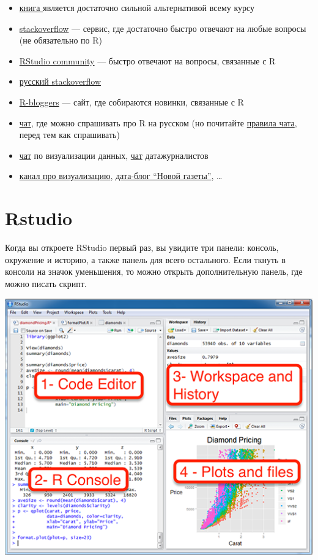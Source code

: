 \documentclass[]{book}
\providecommand{\tightlist}{%
  \setlength{\itemsep}{0pt}\setlength{\parskip}{0pt}}
\begin{document}
\begin{itemize}
\tightlist
\item
  \href{https://r4ds.had.co.nz/}{книга \citep{wickham16}} является достаточно сильной альтернативой всему курсу
\item
  \href{https://stackoverflow.com}{stackoverflow} --- сервис, где достаточно быстро отвечают на любые вопросы (не обязательно по R)
\item
  \href{https://community.rstudio.com/}{RStudio community} --- быстро отвечают на вопросы, связанные с R
\item
  \href{https://ru.stackoverflow.com}{русский stackoverflow}
\item
  \href{https://www.r-bloggers.com/}{R-bloggers} --- сайт, где собираются новинки, связанные с R
\item
  \href{https://t.me/rlang_ru}{чат}, где можно спрашивать про R на русском (но почитайте \href{https://github.com/r-lang-group-ru/group-rules/blob/master/README.md}{правила чата}, перед тем как спрашивать)
\item
  \href{https://t.me/joinchat/CxZg5goGc6rlWGjcvOYrpA}{чат} по визуализации данных, \href{https://t.me/ddjrus}{чат} датажурналистов
\item
  \href{https://t.me/chartomojka}{канал про визуализацию}, \href{https://t.me/novaya_data}{дата-блог ``Новой газеты''}, \ldots{}
\end{itemize}

\hypertarget{rstudio}{%
\section{Rstudio}\label{rstudio}}

Когда вы откроете RStudio первый раз, вы увидите три панели: консоль, окружение и историю, а также панель для всего остального. Если ткнуть в консоли на значок уменьшения, то можно открыть дополнительную панель, где можно писать скрипт.

\includegraphics[width=6.94in]{images/01_01_rstudio}
\end{document}
